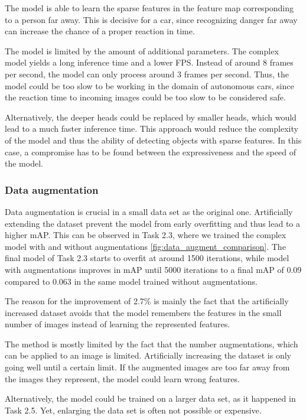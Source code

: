\documentclass{article}
\begin{document}
The model is able to learn the sparse features in the feature map corresponding to a person far away. This is decisive for a car, since recognizing danger far away can increase the chance of a proper reaction in time.

The model is limited by the amount of additional parameters. The complex model yields a long inference time and a lower FPS. Instead of around 8 frames per second, the model can only process around 3 frames per second. Thus, the model could be too slow to be working in the domain of autonomous cars, since the reaction time to incoming images could be too slow to be considered safe.

Alternatively, the deeper heads could be replaced by smaller heads, which would lead to a much faster inference time. This approach would reduce the complexity of the model and thus the ability of detecting objects with sparse features. In this case, a compromise has to be found between the expressiveness and the speed of the model.


\subsubsection*{Data augmentation}

Data augmentation is crucial in a small data set as the original one. Artificially extending the dataset prevent the model from early overfitting and thus lead to a higher mAP. This can be observed in Task 2.3, where we trained the complex model with and without augmentations \ref{fig:data_augment_comparison}. The final model of Task 2.3 starts to overfit at around 1500 iterations, while model with augmentations improves in mAP until 5000 iterations to a final mAP of 0.09 compared to 0.063 in the same model trained without augmentations. 

The reason for the improvement of 2.7\% is mainly the fact that the artificially increased dataset avoids that the model remembers the features in the small number of images instead of learning the represented features.

The method is mostly limited by the fact that the number augmentations, which can be applied to an image is limited. Artificially increasing the dataset is only going well until a certain limit. If the augmented images are too far away from the images they represent, the model could learn wrong features.

Alternatively, the model could be trained on a larger data set, as it happened in Task 2.5. Yet, enlarging the data set is often not possible or expensive.
\end{document}
